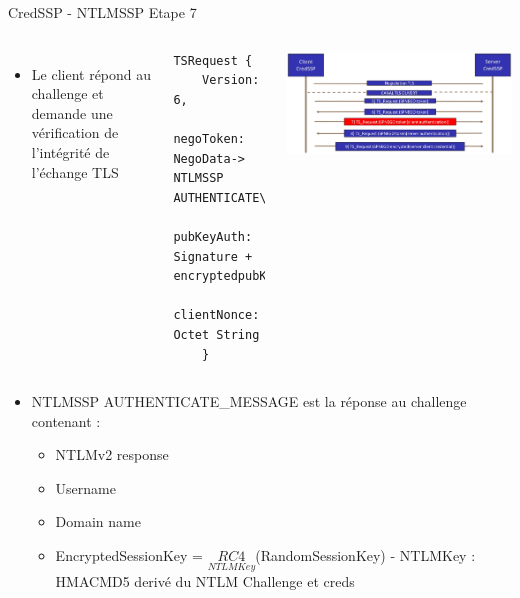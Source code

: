 \documentclass{beamer}
\begin{document}
\begin{frame}[fragile]{CredSSP - NTLMSSP Etape 7}
	 \begin{columns}[T]
	 	\begin{itemize}
	 	\item Le client répond au challenge et demande une vérification de l'intégrité de l'échange TLS
	 	\end{itemize}
	 \begin{lstlisting}[frame=single,basicstyle=\tiny]
TSRequest {
	Version:     6,
	negoToken:   NegoData-> NTLMSSP AUTHENTICATE\_MESSAGE,
	pubKeyAuth: Signature + encryptedpubKey,
	clientNonce: Octet String
	}
	\end{lstlisting}
	 \includegraphics[scale=0.07]{step7.jpg}
	 \end{columns}
	 
	 \begin{itemize}
	 	\item NTLMSSP AUTHENTICATE\_MESSAGE est la réponse au challenge contenant :
	 		\begin{itemize}
	 		\item NTLMv2 response
	 		\item Username
	 		\item Domain name
	 		\item EncryptedSessionKey = $\underset{NTLMKey}{RC4}$(RandomSessionKey) - NTLMKey : HMACMD5 derivé du NTLM Challenge et creds
	 		\end{itemize}
	 	\end{itemize}
\end{frame}
\end{document}
